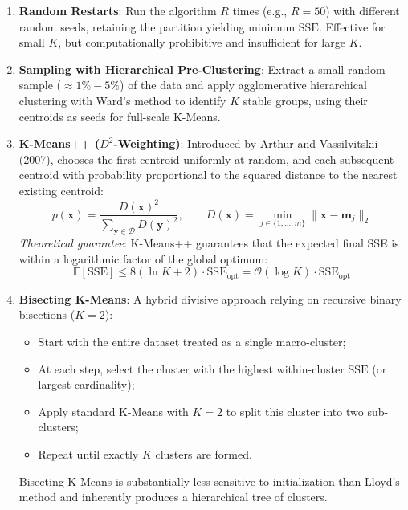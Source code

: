 \begin{enumerate}
    \item \textbf{Random Restarts}: Run the algorithm $R$ times (e.g., $R = 50$) with different random seeds, retaining the partition yielding minimum $\mathrm{SSE}$. Effective for small $K$, but computationally prohibitive and insufficient for large $K$.
    \item \textbf{Sampling with Hierarchical Pre-Clustering}: Extract a small random sample ($\approx 1\% - 5\%$) of the data and apply agglomerative hierarchical clustering with Ward's method to identify $K$ stable groups, using their centroids as seeds for full-scale K-Means.
    \item \textbf{K-Means++ ($D^2$-Weighting)}: Introduced by Arthur and Vassilvitskii (2007), chooses the first centroid uniformly at random, and each subsequent centroid with probability proportional to the squared distance to the nearest existing centroid:
    \begin{equation}
        p(\mathbf{x}) = \frac{D(\mathbf{x})^2}{\sum_{\mathbf{y} \in \mathcal{D}} D(\mathbf{y})^2}, \qquad D(\mathbf{x}) = \min_{j \in \{1, \dots, m\}} \|\mathbf{x} - \mathbf{m}_j\|_2
    \end{equation}
    \textit{Theoretical guarantee}: K-Means++ guarantees that the expected final SSE is within a logarithmic factor of the global optimum:
    \begin{equation}
        \mathbb{E}[\mathrm{SSE}] \le 8(\ln K + 2) \cdot \mathrm{SSE}_{\text{opt}} = \mathcal{O}(\log K) \cdot \mathrm{SSE}_{\text{opt}}
    \end{equation}
    \item \textbf{Bisecting K-Means}: A hybrid divisive approach relying on recursive binary bisections ($K=2$):
    \begin{itemize}[noitemsep]
        \item Start with the entire dataset treated as a single macro-cluster;
        \item At each step, select the cluster with the highest within-cluster $\mathrm{SSE}$ (or largest cardinality);
        \item Apply standard K-Means with $K=2$ to split this cluster into two sub-clusters;
        \item Repeat until exactly $K$ clusters are formed.
    \end{itemize}
    Bisecting K-Means is substantially less sensitive to initialization than Lloyd's method and inherently produces a hierarchical tree of clusters.
\end{enumerate}


